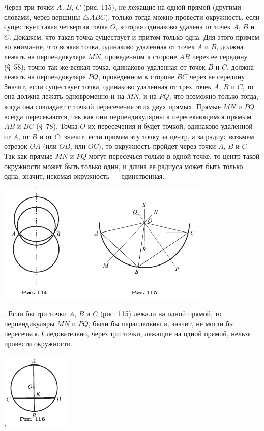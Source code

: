 \documentclass[oneside]{book}
\begin{document}
Через три точки $A$, $B$, $C$ (рис. 115), не лежащие на одной прямой (другими словами, через вершины $\triangle ABC$), только тогда можно провести окружность, если существует такая четвертая точка $O$, которая одинаково удалена от точек $A$, $B$ и $C$.
Докажем, что такая точка существует и притом только одна.
Для этого примем во внимание, что всякая точка, одинаково удаленная от точек $A$ и $B$, должна лежать на перпендикуляре $MN$, проведенном к стороне $AB$ через ее середину (§~58);
точно так же всякая точка, одинаково удаленная от точек $B$ и $C$, должна лежать на перпендикуляре $PQ$, проведенном к стороне $BC$ через ее середину.
Значит, если существует точка, одинаково удаленная от трех точек $A$, $B$ и $C$, то она должна лежать одновременно и на $MN$, и на $PQ$, что возможно только тогда, когда она совпадает с точкой пересечения этих двух прямых.
Прямые $MN$ и $PQ$ всегда пересекаются, так как они перпендикулярны к пересекающимся прямым $AB$ и $BC$ (§~78).
Точка $O$ их пересечения и будет точкой, одинаково удаленной от $A$, от $B$ и от $C$;
значит, если примем эту точку за центр, а за радиус возьмем отрезок $OA$ (или $OB$, или $OC$), то окружность пройдет через точки $A$, $B$ и $C$.
Так как прямые $MN$ и $PQ$ могут пересечься только в одной точке, то центр такой окружности может быть только один, и длина ее радиуса может быть только одна;
значит, искомая окружность — единственная.

\includegraphics{pics/ris-114-115}

.
Если бы три точки $A$, $B$ и $C$ (рис. 115) лежали на одной прямой, то перпендикуляры $MN$ и $PQ$, были бы параллельны и, значит, не могли бы пересечься.
Следовательно, через три точки, лежащие на одной прямой, нельзя провести окружности.

\includegraphics{pics/ris-116}
\end{document}
